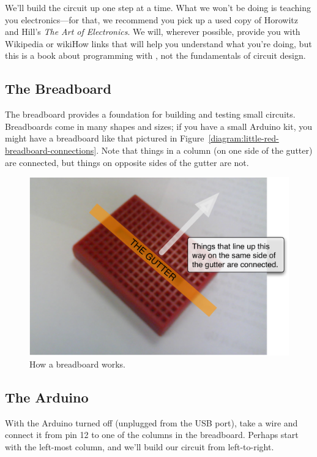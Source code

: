 We'll build the circuit up one step at a time. What we won't be doing is teaching you electronics---for that, we recommend you pick up a used copy of Horowitz and Hill's {\em The Art of Electronics}. We will, wherever possible, provide you with Wikipedia or wikiHow links that will help you understand what you're doing, but this is a book about programming with \plumbing, not the fundamentals of circuit design.

\subsection{The Breadboard}
The breadboard provides a foundation for building and testing small circuits. Breadboards come in many shapes and sizes; if you have a small Arduino kit, you might have a breadboard like that pictured in Figure~\vref{diagram:little-red-breadboard-connections}. Note that things in a column (on one side of the gutter) are connected, but things on opposite sides of the gutter are not. 

\begin{figure}[h]
  \begin{center}
    \includegraphics[width=0.8\linewidth]{images/ch2-little-red-breadboard-connections}
    \caption{How a breadboard works.}
    \label{diagram:ch2-little-red-breadboard-connections}
  \end{center}
\end{figure}

\subsection{The Arduino}
With the Arduino turned off (unplugged from the USB port), take a wire and connect it from pin 12 to one of the columns in the breadboard. Perhaps start with the left-most column, and we'll build our circuit from left-to-right.

